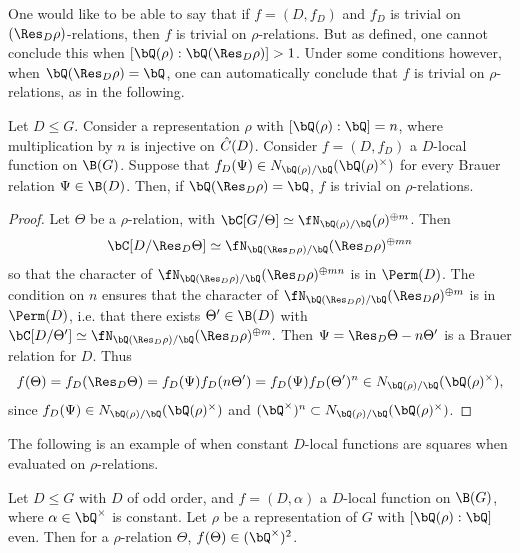  One would like to be able to say that if $f = (D, f_D)$ and $f_D$ is trivial on $(\Res_D \rho)$-relations, then $f$ is trivial on $\rho$-relations. But as defined, one cannot conclude this when $[\bQ(\rho) : \bQ(\Res_D \rho) ] > 1$. Under some conditions however, when $\bQ(\Res_D \rho) = \bQ$, one can automatically conclude that $f$ is trivial on $\rho$-relations, as in the following.

\begin{prop}\label{rational-res}
Let $D \leq G$. Consider a representation $\rho$ with $[\bQ(\rho) : \bQ] = n$, where multiplication by $n$ is injective on $\hat{C}(D)$. Consider $f = (D, f_D)$ a $D$-local function on $\B(G)$. 
Suppose that $f_D(\Psi) \in \fieldnorm{\rho}$ for every Brauer relation $\Psi \in \B(D)$.
Then, if $\bQ(\Res_D \rho) = \bQ$, $f$ is trivial on $\rho$-relations.
\end{prop}

\begin{proof}
    Let $\Theta$ be a $\rho$-relation, with $\bC[G / \Theta] \simeq \repnorm{\rho}^{\oplus m}$. Then $$\bC[D / \Res_D \Theta] \simeq \repnorm{\Res_D \rho}^{\oplus m n}$$
    so that the character of $\repnorm{\Res_D \rho}^{\oplus m n}$ is in $\Perm(D)$.
    The condition on $n$ ensures that the character of $\repnorm{\Res_D \rho}^{\oplus m}$ is in $\Perm(D)$, i.e. that there exists $\Theta' \in \B(D)$ with $\bC[D / \Theta'] \simeq \repnorm{\Res_D \rho}^{\oplus m}.$ Then $\Psi = \Res_D\Theta - n\Theta'$ is a Brauer relation for $D$. Thus
    \[ f(\Theta) = f_D(\Res_D \Theta) = f_D(\Psi)f_D(n\Theta') = f_D(\Psi)f_D(\Theta')^n \in \fieldnorm{\rho}, \]
    since $f_D(\Psi) \in \fieldnorm{\rho}$ and $(\bQ^{\times})^n \subset \fieldnorm{\rho}$. 
\end{proof}

The following is an example of when constant $D$-local functions are squares when evaluated on $\rho$-relations.

\begin{prop}\label{const-fns}
     Let $D \leq G$ with $D$ of odd order, and $f = (D, \alpha)$ a $D$-local function on $\B(G)$, where $\alpha \in \bQ^{\times}$ is constant. Let $\rho$ be a representation of $G$ with $[\bQ(\rho) : \bQ ]$ even. Then for a $\rho$-relation $\Theta$, $f(\Theta) \in (\bQ^{\times})^2$. 
\end{prop}

